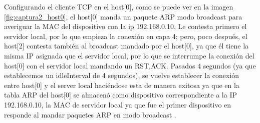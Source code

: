 Configurando el cliente TCP en el host[0], como se puede ver en la imagen \ref{fig:captura2_host0}, el host[0] manda un paquete ARP modo broadcast para averiguar la MAC del dispositivo con la ip 192.168.0.10. Le contesta primero el servidor local, por lo que empieza la conexión en capa 4; pero, poco después, el host[2] contesta también al broadcast mandado por el host[0], ya que él tiene la misma IP asignada que el servidor local, por lo que se interrumpe la conexión del host[0] con el servidor local mandando un RST,ACK. Pasados 4 segundos (ya que establecemos un idleInterval de 4 segundos), se vuelve establecer la conexión entre host[0] y el server local haciéndose esta de manera exitosa ya que en la tabla ARP del host[0] se almacenó como dispositivo correspondiente a la IP 192.168.0.10, la MAC de servidor local ya que fue el primer dispositivo en responde al mandar paquetes ARP en modo broadcast .

